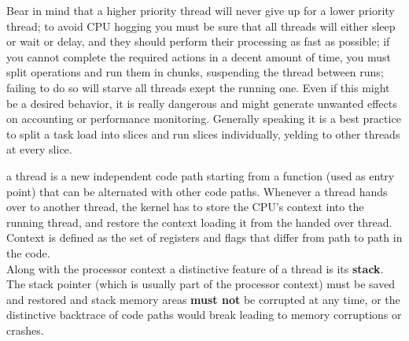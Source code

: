 \documentclass[11pt,b5paper]{scrbook}
\begin{document}
\begin{description}
Bear in mind that a higher priority thread will never give up for a lower priority
thread; to avoid CPU hogging you must be sure that all threads will either sleep or 
wait or delay, and they should perform their processing as fast as possible;
if you cannot complete the required actions in a decent amount of time, you must split
operations and run them in chunks, suspending the thread between runs;
failing to do so will starve all threads exept the running one.
Even if this might be a desired behavior, it is really dangerous and might generate unwanted effects
on accounting or performance monitoring.
Generally speaking it is a best practice to split a task load into slices and run slices individually,
yelding to other threads at every slice.

\item[Threads] a thread is a new independent code path starting from a
function (used as entry point) that can be alternated with other code paths.
Whenever a thread hands over to another thread, the kernel has to store the
CPU's context into the running thread, and restore the context loading it from
the handed over thread.
Context is defined as the set of registers and flags that differ from path to
path in the code.\\
Along with the processor context a distinctive feature of a thread is its \textbf{stack}.
The stack pointer (which is usually part of the processor context) must be saved and restored
and stack memory areas \textbf{must not} be corrupted at any time, or the distinctive backtrace of 
code paths would break leading to memory corruptions or crashes.

\begin{figure}
\centering
{}


\end{figure}
\end{description}
\end{document}
